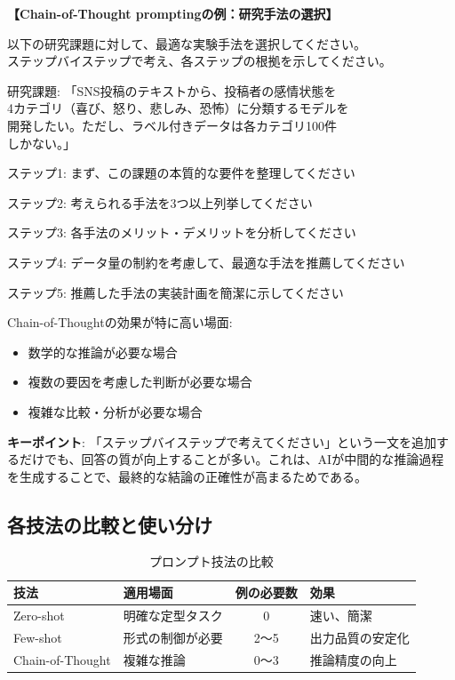 \begin{promptbox}
\textbf{【Chain-of-Thought promptingの例：研究手法の選択】}

以下の研究課題に対して、最適な実験手法を選択してください。\\
ステップバイステップで考え、各ステップの根拠を示してください。

研究課題: 「SNS投稿のテキストから、投稿者の感情状態を\\
4カテゴリ（喜び、怒り、悲しみ、恐怖）に分類するモデルを\\
開発したい。ただし、ラベル付きデータは各カテゴリ100件\\
しかない。」

ステップ1: まず、この課題の本質的な要件を整理してください

ステップ2: 考えられる手法を3つ以上列挙してください

ステップ3: 各手法のメリット・デメリットを分析してください

ステップ4: データ量の制約を考慮して、最適な手法を推薦してください

ステップ5: 推薦した手法の実装計画を簡潔に示してください
\end{promptbox}

Chain-of-Thoughtの効果が特に高い場面:
\begin{itemize}
\item 数学的な推論が必要な場合
\item 複数の要因を考慮した判断が必要な場合
\item 複雑な比較・分析が必要な場合
\end{itemize}

\begin{screen}
\textbf{キーポイント}: 「ステップバイステップで考えてください」という一文を追加するだけでも、回答の質が向上することが多い。これは、AIが中間的な推論過程を生成することで、最終的な結論の正確性が高まるためである。
\end{screen}

\subsection{各技法の比較と使い分け}

\begin{table}[htbp]
\centering
\caption{プロンプト技法の比較}
\label{tab:prompt_techniques}
\small
\begin{tabular}{llcl}
\toprule
技法 & 適用場面 & 例の必要数 & 効果 \\
\midrule
Zero-shot & 明確な定型タスク & 0 & 速い、簡潔 \\
Few-shot & 形式の制御が必要 & 2〜5 & 出力品質の安定化 \\
Chain-of-Thought & 複雑な推論 & 0〜3 & 推論精度の向上 \\
\bottomrule
\end{tabular}
\end{table}

